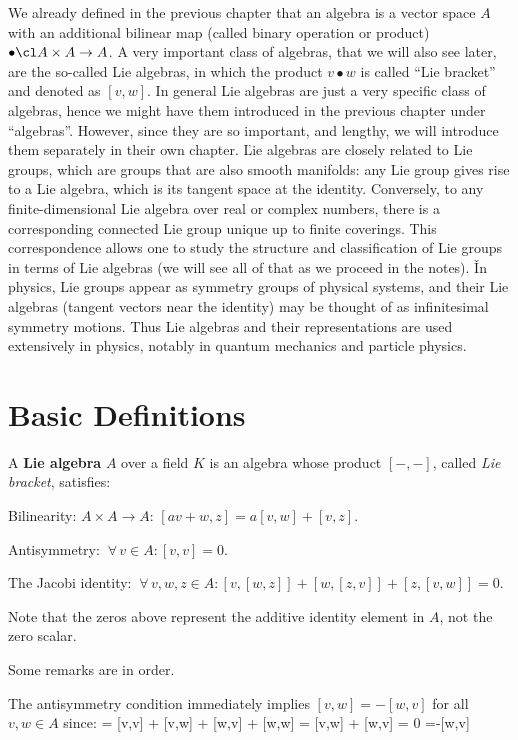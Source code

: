 We already defined in the previous chapter that an algebra is a vector space $A$ with an additional bilinear map
(called binary operation or product) $\bullet \cl A\times A \to A$. A very important class of algebras, that we will
also see later, are the so-called Lie algebras, in which the product $v \bullet w$ is called ``Lie bracket'' and
denoted as $[v,w]$. In general Lie algebras are just a very specific class of algebras, hence we might have them
introduced in the previous chapter under ``algebras''. However, since they are so important, and lengthy, we will
introduce them separately in their own chapter. \v

Lie algebras are closely related to Lie groups, which are groups that are also smooth manifolds: any Lie group gives
rise to a Lie algebra, which is its tangent space at the identity. Conversely, to any finite-dimensional Lie algebra
over real or complex numbers, there is a corresponding connected Lie group unique up to finite coverings. This
correspondence allows one to study the structure and classification of Lie groups in terms of Lie algebras (we will
see all of that as we proceed in the notes). \v

In physics, Lie groups appear as symmetry groups of physical systems, and their Lie algebras (tangent vectors near
the identity) may be thought of as infinitesimal symmetry motions. Thus Lie algebras and their representations are
used extensively in physics, notably in quantum mechanics and particle physics.

\section{Basic Definitions}

A \textbf{Lie algebra} $A$ over a field $K$ is an algebra whose product $[-,-]$, called \emph{Lie bracket}, satisfies:
\ben[label=\roman*)]
\item Bilinearity: $A \times A \to A$: $[av+w,z]= a [v,w] + [v,z]$.
\item Antisymmetry: $\ \forall\, v\in A : [v,v]=0.$
\item The Jacobi identity: $\ \forall\, v,w,z\in A : [v,[w,z]] + [w,[z,v]] + [z,[v,w]] = 0.$
\een

Note that the zeros above represent the additive identity element in $A$, not the zero scalar.
\ed

Some remarks are in order.

The antisymmetry condition immediately implies $[v,w]=-[w,v]$ for all $v,w\in A$ since:
\bse
[v+w, v+w] = [v,v] + [v,w] + [w,v] + [w,w] = [v,w] + [w,v] = 0 \implies [v,w]=-[w,v]
\ese

